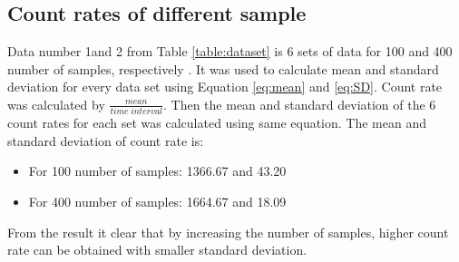 \documentclass[a4paper,12pt]{article}
\begin{document}
\subsection{Count rates of different sample}
\label{sec:countrate}

Data number 1and 2 from Table \ref{table:dataset} is 6 sets of data for 100 and 400 number of samples, respectively . It was used to calculate mean and standard deviation for every data set using Equation \ref{eq:mean} and \ref{eq:SD}. Count rate was calculated by $\frac{mean}{time\;interval}$. Then the mean and standard deviation of the 6 count rates for each set was calculated using same equation. The mean and standard deviation of count rate is:
\begin{itemize}
\item For 100 number of samples: 1366.67 and 43.20
\item For 400 number of samples: 1664.67 and 18.09
\end {itemize}
From the result it clear that by increasing the number of samples, higher count rate can be obtained with smaller standard deviation. 


\end{document}
